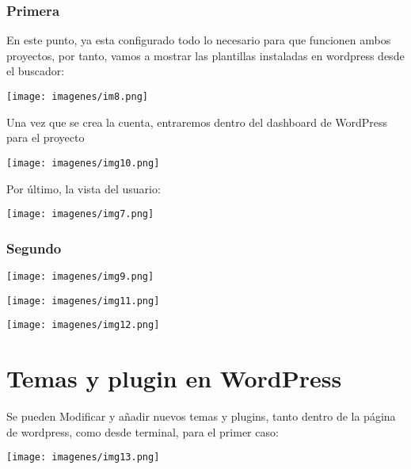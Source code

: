 \documentclass{article}
\begin{document}
\subsubsection{Primera}
\begin{flushleft}
En este punto, ya esta configurado todo lo necesario para que funcionen ambos proyectos, por tanto, vamos a mostrar las plantillas instaladas en wordpress desde el buscador:
\end{flushleft}

\begin{center}
\texttt{[image: imagenes/im8.png]} 
\end{center}

\begin{flushleft}
Una vez que se crea la cuenta, entraremos dentro del dashboard de WordPress para el proyecto
\end{flushleft}

\begin{center}
\texttt{[image: imagenes/img10.png]} 
\end{center}

Por último, la vista del usuario:
\begin{center}
\texttt{[image: imagenes/img7.png]} 
\end{center}


\subsubsection{Segundo}

\begin{center}
\texttt{[image: imagenes/img9.png]} 
\end{center}

\begin{center}
\texttt{[image: imagenes/img11.png]} 
\end{center}


\begin{center}
\texttt{[image: imagenes/img12.png]} 
\end{center}

\section{Temas y plugin en WordPress}
Se pueden Modificar y añadir nuevos temas y plugins, tanto dentro de la página de wordpress, como desde terminal, para el primer caso:

\begin{center}
\texttt{[image: imagenes/img13.png]} 
\end{center}
\end{document}
